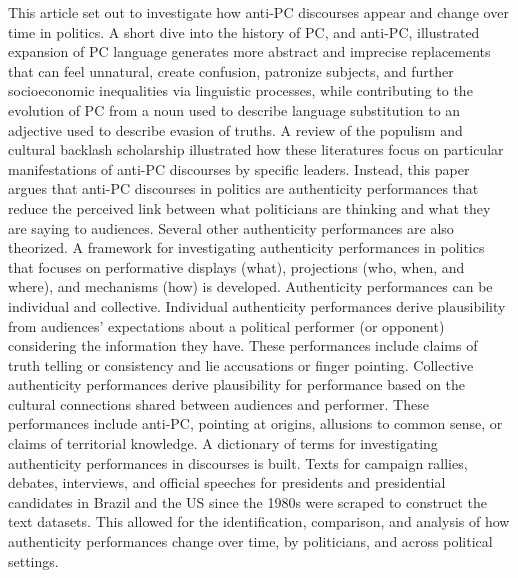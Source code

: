\documentclass[smallextended]{svjour3}       %
\begin{document}
This article set out to investigate how anti-PC discourses appear and
change over time in politics. A short dive into the history of PC, and
anti-PC, illustrated expansion of PC language generates more abstract
and imprecise replacements that can feel unnatural, create confusion,
patronize subjects, and further socioeconomic inequalities via
linguistic processes, while contributing to the evolution of PC from a
noun used to describe language substitution to an adjective used to
describe evasion of truths. A review of the populism and cultural
backlash scholarship illustrated how these literatures focus on
particular manifestations of anti-PC discourses by specific leaders.
Instead, this paper argues that anti-PC discourses in politics are
authenticity performances that reduce the perceived link between what
politicians are thinking and what they are saying to audiences. Several
other authenticity performances are also theorized. A framework for
investigating authenticity performances in politics that focuses on
performative displays (what), projections (who, when, and where), and
mechanisms (how) is developed. Authenticity performances can be
individual and collective. Individual authenticity performances derive
plausibility from audiences' expectations about a political performer
(or opponent) considering the information they have. These performances
include claims of truth telling or consistency and lie accusations or
finger pointing. Collective authenticity performances derive
plausibility for performance based on the cultural connections shared
between audiences and performer. These performances include anti-PC,
pointing at origins, allusions to common sense, or claims of territorial
knowledge. A dictionary of terms for investigating authenticity
performances in discourses is built. Texts for campaign rallies,
debates, interviews, and official speeches for presidents and
presidential candidates in Brazil and the US since the 1980s were
scraped to construct the text datasets. This allowed for the
identification, comparison, and analysis of how authenticity
performances change over time, by politicians, and across political
settings.
\end{document}
